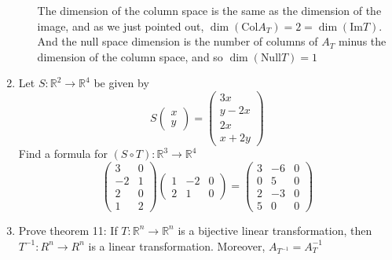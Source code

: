 \documentclass[letterpaper]{article}
\begin{document}
\begin{enumerate}
\begin{enumerate}
  The dimension of the column space is the same as the dimension of the image, and as we just pointed out, $\dim(\text{Col} A_T)=2=\dim(\text{Im} T)$. And the null space dimension is the number of columns of $A_T$ minus the dimension of the column space, and so $\dim(\text{Null} T)=1$
  \end{enumerate}
\item
Let $S:\mathbb{R}^2\to\mathbb{R}^4$ be given by
\[S\left(\begin{array}{r}x\\y\end{array}\right)
  =\left(\begin{array}{r}3x\\y-2x\\2x\\x+2y\end{array}\right)\]
Find a formula for $(S\circ T):\mathbb{R}^3\to\mathbb{R}^4$
\[\left(\begin{array}{rr}3&0\\-2&1\\2&0\\1&2\end{array}\right)
  \left(\begin{array}{rrr}1&-2&0\\2&1&0\end{array}\right)
 =\left(\begin{array}{rrr}3&-6&0\\0&5&0\\2&-3&0\\5&0&0\end{array}\right)
\]
\item
Prove theorem 11: If $T:\mathbb{R}^n\to\mathbb{R}^n$ is a bijective linear transformation, then $T^{-1}:R^n\to R^n$ is a linear transformation. Moreover, $A_{T^{-1}}=A_T^{-1}$


\end{enumerate}
\end{document}

